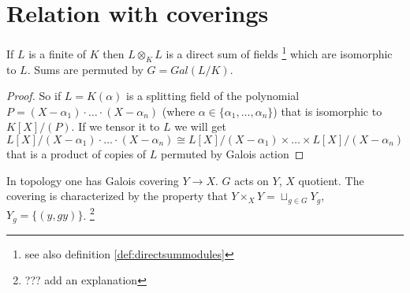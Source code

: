 \section{Relation with coverings}

\begin{remark}
  If $L$ is a finite  of $K$ then
  $ L \otimes_K L$ is a direct sum of fields
  \footnote{
    see also definition \ref{def:directsummodules}
  }
  which are
  isomorphic to $L$. Sums are permuted by $G = Gal\left(L/K\right)$.
  \begin{proof}
  So if $L = K\left(\alpha\right)$ is a splitting field of the
  polynomial $P = \left(X - \alpha_1\right) \cdot \dots \cdot \left(X
  - \alpha_n\right)$ (where $\alpha \in \{\alpha_1, \dots,
  \alpha_n\}$) that is isomorphic to $K\left[X\right]/(P)$. If 
  we tensor it to $L$ we will get
  \[
  L\left[X\right]/\left(X - \alpha_1\right) \cdot \dots \cdot \left(X
  - \alpha_n\right) \cong
  L\left[X\right]/\left(X - \alpha_1\right) \times
  \dots \times
  L\left[X\right]/\left(X - \alpha_n\right)
  \]
  that is a product of copies of $L$ permuted by Galois action
  \end{proof}
  \label{rem:lec8_1}
\end{remark}

In topology one has Galois covering $Y \to X$. $G$ acts on $Y$, $X$
quotient. The covering is characterized by the property that $Y
\times_X Y = \sqcup_{g \in G} Y_g$, $Y_g = \{\left(y, gy\right)\}$.
\footnote{
  ??? add an explanation
}
